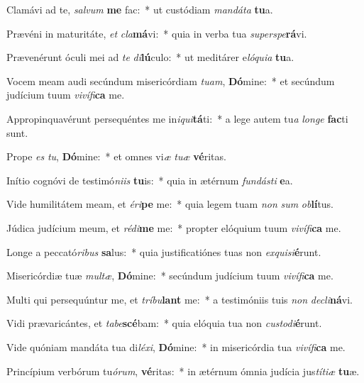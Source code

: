 \item Clamávi ad te, \textit{sal}\textit{vum} \textbf{me} fac:~* ut custódiam \textit{man}\textit{dá}\textit{ta} \textbf{tu}a.
\item Prævéni in maturitáte, \textit{et} \textit{cla}\textbf{má}vi:~* quia in verba tua \textit{su}\textit{per}\textit{spe}\textbf{rá}vi.
\item Prævenérunt óculi mei ad \textit{te} \textit{di}\textbf{lú}culo:~* ut meditárer e\textit{ló}\textit{qui}\textit{a} \textbf{tu}a.
\item Vocem meam audi secúndum misericórdiam \textit{tu}\textit{am}, \textbf{Dó}mine:~* et secúndum judícium tuum \textit{vi}\textit{ví}\textit{fi}\textbf{ca} me.
\item Appropinquavérunt persequéntes me in\textit{i}\textit{qui}\textbf{tá}ti:~* a lege autem tu\textit{a} \textit{lon}\textit{ge} \textbf{fac}ti sunt.
\item Prope \textit{es} \textit{tu}, \textbf{Dó}mine:~* et omnes vi\textit{æ} \textit{tu}\textit{æ} \textbf{vé}ritas.
\item Inítio cognóvi de testimó\textit{ni}\textit{is} \textbf{tu}is:~* quia in ætérnum \textit{fun}\textit{dás}\textit{ti} \textbf{e}a.
\item Vide humilitátem meam, et \textit{é}\textit{ri}\textbf{pe} me:~* quia legem tuam \textit{non} \textit{sum} \textit{ob}\textbf{lí}tus.
\item Júdica judícium meum, et \textit{réd}\textit{i}\textbf{me} me:~* propter elóquium tuum \textit{vi}\textit{ví}\textit{fi}\textbf{ca} me.
\item Longe a peccató\textit{ri}\textit{bus} \textbf{sa}lus:~* quia justificatiónes tuas non \textit{ex}\textit{qui}\textit{si}\textbf{é}runt.
\item Misericórdiæ tuæ \textit{mul}\textit{tæ}, \textbf{Dó}mine:~* secúndum judícium tuum \textit{vi}\textit{ví}\textit{fi}\textbf{ca} me.
\item Multi qui persequúntur me, et \textit{trí}\textit{bu}\textbf{lant} me:~* a testimóniis tuis \textit{non} \textit{de}\textit{cli}\textbf{ná}vi.
\item Vidi prævaricántes, et \textit{ta}\textit{be}\textbf{scé}bam:~* quia elóquia tua non \textit{cus}\textit{to}\textit{di}\textbf{é}runt.
\item Vide quóniam mandáta tua di\textit{lé}\textit{xi}, \textbf{Dó}mine:~* in misericórdia tua \textit{vi}\textit{ví}\textit{fi}\textbf{ca} me.
\item Princípium verbórum tu\textit{ó}\textit{rum}, \textbf{vé}ritas:~* in ætérnum ómnia judícia jus\textit{tí}\textit{ti}\textit{æ} \textbf{tu}æ.
